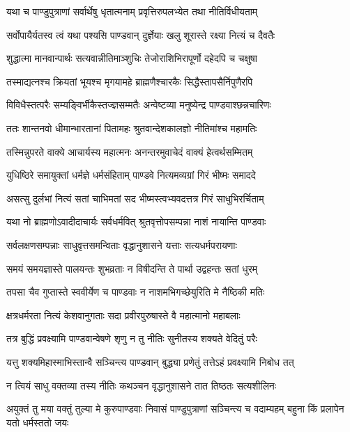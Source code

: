 \twolineshloka
{यथा च पाण्डुपुत्राणां सर्वार्थेषु धृतात्मनाम्}
{प्रवृत्तिरुपलभ्येत तथा नीतिर्विधीयताम्}


\twolineshloka
{सर्वोपायैर्यतस्व त्वं यथा पश्यसि पाण्डवान्}
{दुर्ज्ञेयाः खलु शूरास्ते रक्ष्या नित्यं च दैवतैः}


\twolineshloka
{शुद्धात्मा मानवान्पार्थः सत्यवान्नीतिमाञ्शुचिः}
{तेजोराशिभिरापूर्णो दहेदपि च चक्षुषा}


\twolineshloka
{तस्माद्यत्नश्च क्रियतां भूयश्च मृगयामहे}
{ब्राह्मणैश्चारकैः सिद्धैस्तापसैर्निपुणैरपि}


\twolineshloka
{विविधैस्तत्परैः सम्यङ्विर्भीकैस्तज्ज्ञसम्मतैः}
{अन्वेष्टव्या मनुष्येन्द्र पाण्डवाश्छन्नचारिणः}


\twolineshloka
{ततः शान्तनवो धीमान्भारतानां पितामहः}
{श्रुतवान्देशकालज्ञो नीतिमांश्च महामतिः}


\twolineshloka
{तस्मिन्नुपरते वाक्ये आचार्यस्य महात्मनः}
{अनन्तरमुवाचेदं वाक्यं हेत्वर्थसम्मितम्}


\twolineshloka
{युधिष्ठिरे समायुक्तां धर्मज्ञे धर्मसंहिताम्}
{पाण्डवे नित्यमव्यग्रां गिरं भीष्मः समाददे}


\twolineshloka
{असत्सु दुर्लभां नित्यं सतां चाभिमतां सद}
{भीष्मस्त्वभ्यवदत्तत्र गिरं साधुभिरर्चिताम्}


\twolineshloka
{यथा नो ब्राह्मणोऽवादीदाचार्यः सर्वधर्मवित्}
{श्रुतवृत्तोपसम्पन्ना नाशं नायान्ति पाण्डवाः}


\twolineshloka
{सर्वलक्षणसम्पन्नाः साधुवृत्तसमन्विताः}
{वृद्धानुशासने यत्ताः सत्यधर्मपरायणाः}


\twolineshloka
{समयं समयज्ञास्ते पालयन्तः शुभव्रताः}
{न विषीदन्ति ते पार्था उद्वहन्तः सतां धुरम्}


\twolineshloka
{तपसा चैव गुप्तास्ते स्ववीर्येण च पाण्डवाः}
{न नाशमभिगच्छेयुरिति मे नैष्ठिकी मतिः}


\twolineshloka
{क्षत्रधर्मरता नित्यं केशवानुगताः सदा}
{प्रवीरपुरुषास्ते वै महात्मानो महाबलाः}


\twolineshloka
{तत्र बुद्धिं प्रवक्ष्यामि पाण्डवान्वेषणे शृणु}
{न तु नीतिः सुनीतस्य शक्यते वेदितुं परैः}


\twolineshloka
{यत्तु शक्यमिहास्माभिस्तान्वै सञ्चिन्त्य पाण्डवान्}
{बुद्ध्या प्रणेतुं तत्तेऽहं प्रवक्ष्यामि निबोध तत्}


\twolineshloka
{न त्वियं साधु वक्तव्या तस्य नीतिः कथञ्चन}
{वृद्धानुशासने तात तिष्ठतः सत्यशीलिनः}


\threelineshloka
{अयुक्तं तु मया वक्तुं तुल्या मे कुरुपाण्डवाः}
{निवासं पाण्डुपुत्राणां सञ्चिन्त्य च वदाम्यहम्}
{बहुना किं प्रलापेन यतो धर्मस्ततो जयः}


